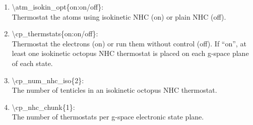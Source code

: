 \documentclass[12pt,titlepage]{article}
\begin{document}
\begin{enumerate}
 \vspace{0.15in}
 \item   \textbackslash{}atm\_isokin\_opt\{on:on/off\}: \\
    Thermostat the atoms using isokinetic NHC (on) or plain NHC (off).

 \vspace{0.15in}
 \item   \textbackslash{}cp\_thermstats\{on:on/off\}: \\
    Thermostat the electrons (on) or run them without control (off).
    If ``on'', at least one isokinetic octopus NHC thermostat is placed on each
    g-space plane of each state.

 \vspace{0.15in}
 \item   \textbackslash{}cp\_num\_nhc\_iso\{2\}: \\
    The number of tenticles in an isokinetic octopus NHC thermostat.

 \vspace{0.15in}
 \item   \textbackslash{}cp\_nhc\_chunk\{1\}: \\
    The number of thermostats per g-space electronic state plane.
\end{enumerate}

\newpage
\end{document}
